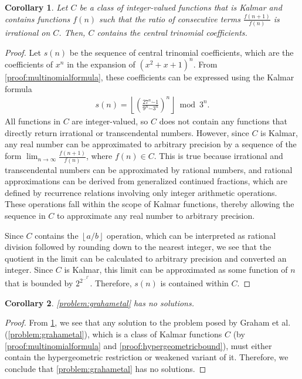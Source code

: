\documentclass[10pt,a4paper]{article}
\theoremstyle{plain}
\newtheorem{corollary}{Corollary}[section]
\newcommand{\floor}[1]{\left\lfloor #1 \right\rfloor}
\begin{document}
\begin{corollary} \label{proof:trinomialnoclass}
Let $C$ be a class of integer-valued functions that is Kalmar and contains functions $f(n)$ such that the ratio of consecutive terms $\frac{f(n+1)}{f(n)}$ is irrational on $C$. Then, $C$ contains the central trinomial coefficients.
\end{corollary}
\begin{proof}
Let $s(n)$ be the sequence of central trinomial coefficients, which are the coefficients of $x^n$ in the expansion of $(x^2+x+1)^n$. From \cref{proof:multinomialformula}, these coefficients can be expressed using the Kalmar formula
\begin{align*}
s(n) = \floor{\left(\frac{27^n \dot{-} 1}{9^n \dot{-} 3^n}\right)^n} \bmod 3^n .
\end{align*}
All functions in $C$ are integer-valued, so $C$ does not contain any functions that directly return irrational or transcendental numbers. However, since $C$ is Kalmar, any real number can be approximated to arbitrary precision by a sequence of the form $\lim_{n \to \infty} \frac{f(n+1)}{f(n)}$, where $f(n) \in C$. This is true because irrational and transcendental numbers can be approximated by rational numbers, and rational approximations can be derived from generalized continued fractions, which are defined by recurrence relations involving only integer arithmetic operations. These operations fall within the scope of Kalmar functions, thereby allowing the sequence in $C$ to approximate any real number to arbitrary precision.

Since $C$ contains the $\floor{a/b}$ operation, which can be interpreted as rational division followed by rounding down to the nearest integer, we see that the quotient in the limit can be calculated to arbitrary precision and converted an integer. Since $C$ is Kalmar, this limit can be approximated as some function of $n$ that is bounded by $2^{2^{...^{2^n}}}$. Therefore, $s(n)$ is contained within $C$.
\end{proof}

\begin{corollary}
\cref{problem:grahametal} has no solutions.
\end{corollary}
\begin{proof}
From \cref{proof:trinomialnoclass}, we see that any solution to the problem posed by Graham et al. (\cref{problem:grahametal}), which is a class of Kalmar functions $C$ (by \cref{proof:multinomialformula} and \cref{proof:hypergeometricbound}), must either contain the hypergeometric restriction or weakened variant of it. Therefore, we conclude that \cref{problem:grahametal} has no solutions.
\end{proof}
\end{document}
